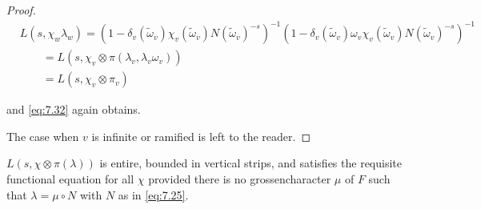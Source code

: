 \begin{proof}
\[
\begin{aligned}
&L(s,\chi_w\lambda_w) = (1 - \delta_v(\tilde{\omega}_v)\chi_v(\tilde{\omega}_v)N(\tilde{\omega}_v)^{-s})^{-1}(1 - \delta_v(\tilde{\omega}_v)\omega_v\chi_v(\tilde{\omega}_v)N(\tilde{\omega}_v)^{-s})^{-1}\\
&\qquad = L(s,\chi_v \otimes \pi(\lambda_v, \lambda_v\omega_v))\\
&\qquad = L(s,\chi_v \otimes \pi_v)
\end{aligned}
\]

and \eqref{eq:7.32} again obtains.

The case when $v$ is infinite or ramified is left to the reader.

\end{proof}

\begin{lemma}\label{lem:7.10}

$L(s,\chi \otimes \pi(\lambda))$ is entire, bounded in vertical strips, and satisfies the requisite functional equation for all $\chi$ provided there is no grossencharacter $\mu$ of $F$ such that $\lambda = \mu \circ N$ with $N$ as in \eqref{eq:7.25}.

\end{lemma}

